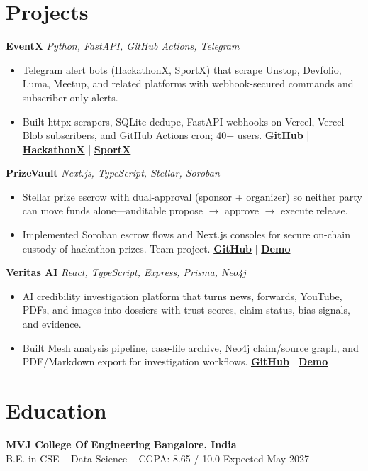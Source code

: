 \documentclass[9pt,letterpaper]{article}
\newcommand{\resumeSubheading}[4]{%
  \vspace{1pt}%
  \textbf{#1} \hfill {\bfseries #2}\\[2pt]
  {#3} \hfill {\color{muted}\small #4}\par\vspace{1pt}%
}
\newcommand{\resumeProject}[2]{%
  \vspace{1pt}%
  \textbf{#1} \hfill {\color{muted}\small\textit{#2}}\par\vspace{1pt}%
}
\newcommand{\resumeItem}{\item}
\newcommand{\resumelink}[2]{\href{#1}{\textbf{#2}}}
\begin{document}
\section{Projects}

\resumeProject{EventX}{Python, FastAPI, GitHub Actions, Telegram}
\begin{itemize}[leftmargin=*, nosep, topsep=1pt, itemsep=0pt]
  \resumeItem{Telegram alert bots (HackathonX, SportX) that scrape Unstop, Devfolio, Luma, Meetup, and related platforms with webhook-secured commands and subscriber-only alerts.}
  \resumeItem{Built httpx scrapers, SQLite dedupe, FastAPI webhooks on Vercel, Vercel Blob subscribers, and GitHub Actions cron; 40+ users. \resumelink{https://github.com/Shashank-V-A/EventX}{GitHub} | \resumelink{https://t.me/EventXva05Bot}{HackathonX} | \resumelink{https://t.me/Sportx_va_bot}{SportX}}
\end{itemize}

\resumeProject{PrizeVault}{Next.js, TypeScript, Stellar, Soroban}
\begin{itemize}[leftmargin=*, nosep, topsep=1pt, itemsep=0pt]
  \resumeItem{Stellar prize escrow with dual-approval (sponsor + organizer) so neither party can move funds alone---auditable propose $\rightarrow$ approve $\rightarrow$ execute release.}
  \resumeItem{Implemented Soroban escrow flows and Next.js consoles for secure on-chain custody of hackathon prizes. Team project. \resumelink{https://github.com/karthik1codes/prizevault}{GitHub} | \resumelink{https://prizevault.vercel.app/}{Demo}}
\end{itemize}

\resumeProject{Veritas AI}{React, TypeScript, Express, Prisma, Neo4j}
\begin{itemize}[leftmargin=*, nosep, topsep=1pt, itemsep=0pt]
  \resumeItem{AI credibility investigation platform that turns news, forwards, YouTube, PDFs, and images into dossiers with trust scores, claim status, bias signals, and evidence.}
  \resumeItem{Built Mesh analysis pipeline, case-file archive, Neo4j claim/source graph, and PDF/Markdown export for investigation workflows. \resumelink{https://github.com/Shashank-V-A/Veritas-AI}{GitHub} | \resumelink{https://veritas-ai-shashank.vercel.app/}{Demo}}
\end{itemize}

\section{Education}
\resumeSubheading
  {MVJ College Of Engineering}{Bangalore, India}
  {B.E. in CSE -- Data Science -- CGPA: 8.65 / 10.0}{Expected May 2027}
\end{document}
